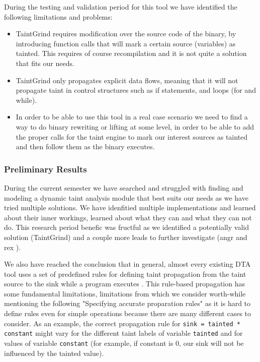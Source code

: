 \documentclass[12pt,a4paper,english,onecolumn]{IEEEtran}
\begin{document}
During the testing and validation period for this tool we have identified the following limitations and problems:
\begin{itemize}
    \item TaintGrind requires modification over the source code of the binary, by introducing function calls that will mark a certain source (variables) as tainted. This requires of course recompilation and it is not quite a solution that fits our needs.
    \item TaintGrind only propagates explicit data flows, meaning that it will not propagate taint in control structures such as if statements, and loops (for and while). 
    \item In order to be able to use this tool in a real case scenario we need to find a way to do binary rewriting or lifting at some level, in order to be able to add the proper calls for the taint engine to mark our interest sources as tainted and then follow them as the binary executes.
\end{itemize}

\subsubsection{Preliminary Results}

During the current semester we have searched and struggled with finding and modeling a dynamic taint analysis module that best suits our needs as we have tried multiple solutions. We have idenfitied multiple implementations and learned about their inner workings, learned about what they can and what they can not do. This research period benefic was fructful as we identified a potentially valid solution (TaintGrind) and a couple more leads to further investigate (angr and rex \cite{rex_repository}).

We also have reached the conclusion that in general, almost every existing DTA tool uses a set of predefined rules for defining taint propagation from the taint source to the sink while a program executes \cite{neutaint}. This rule-based propagation has some fundamental limitations, limitations from which we consider worth-while mentioning the following "Specifying accurate proparation rules" \cite{neutaint} as it is hard to define rules even for simple operations because there are many different cases to consider. As an example, the correct propagation rule for \newline \texttt{sink = tainted * constant} might vary for the different taint labels of variable \newline \texttt{tainted} and for values of variable \texttt{constant} (for example, if constant is 0, our sink will not be influenced by the tainted value).
\end{document}
